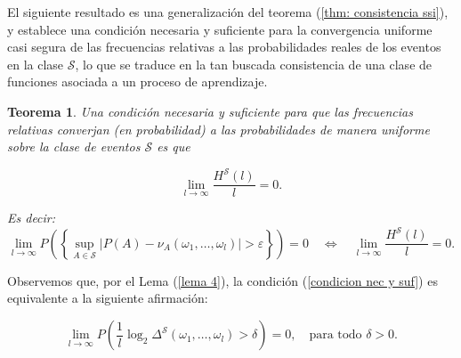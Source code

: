 \documentclass{report}
\newtheorem{thm}{Teorema}[section]
\begin{document}
El siguiente resultado es una generalización del teorema (\ref{thm: consistencia ssi}), y establece una condición necesaria y suficiente para la
convergencia uniforme casi segura de las frecuencias relativas a las probabilidades reales de los eventos en la clase \( \mathcal{S} \), lo que
se traduce en la tan buscada consistencia de una clase de funciones asociada a un proceso de aprendizaje.


\begin{thm}
    Una condición necesaria y suficiente para que las frecuencias relativas converjan (en probabilidad) a
    las probabilidades de manera uniforme sobre la clase de eventos \( \mathcal{S} \) es que

    \begin{equation}
    \lim_{l \to \infty} \frac{H^{\mathcal{S}}(l)}{l} = 0. \label{condicion nec y suf}
    \end{equation}

    Es decir:
    \begin{equation*}
       \lim_{l \to \infty} P\left(\left\{ \sup_{A\in\mathcal{S}} |P(A)-\nu_A\left(\omega_1,\ldots, \omega_l\right)| > \varepsilon\right\} \right) = 0
       \quad \Longleftrightarrow \quad
        \lim_{l \to \infty} \frac{H^{\mathcal{S}}(l)}{l} = 0.
    \end{equation*}
\end{thm}
\bigbreak
    Observemos que, por el Lema (\ref{lema 4}), la condición (\ref{condicion nec y suf}) es equivalente a la siguiente afirmación:

\begin{equation}
    \lim_{l \to \infty} P\left( \frac{1}{l}\log_2 \Delta^{\mathcal{S}}(\omega_1, \dots, \omega_l) > \delta  \right) = 0,
    \quad \text{para todo } \delta > 0.
\end{equation}
\end{document}
